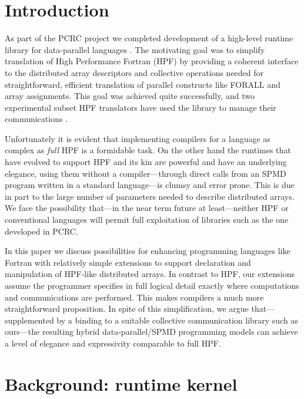 \section{Introduction}


As part of the PCRC \cite{Common_runtime} project we completed development of a
high-level runtime library for data-parallel languages \cite{NPAC_PCRC_kernel}.
The motivating goal was to simplify translation of High Performance
Fortran (HPF) \cite{HPFStandard} by providing a coherent interface to
the distributed array descriptors and collective operations needed for
straightforward, efficient translation of parallel constructs like
FORALL and array assignments.  This goal was achieved quite
successfully, and two experimental subset HPF translators have used the
library to manage their communications \cite{PCRC_based,shpf}.


Unfortunately it is evident that implementing compilers for 
a language as complex as {\em full} HPF is a formidable task.
On the other hand the runtimes that have evolved to support HPF
and its kin are powerful and have an underlying elegance, using them
without a compiler---through direct calls from an SPMD program written
in a standard language---is clumsy and error prone.  This is due in part
to the large number of parameters needed to describe distributed
arrays.  We face the possibility that---in the near term
future at least---neither HPF or conventional languages will permit
full exploitation of libraries such as the one developed in PCRC.

In this paper we discuss possibilities for enhancing
programming languages like Fortran with relatively
simple extensions to support
declaration and manipulation of HPF-like distributed arrays.  In
contrast to HPF, our extensions assume the programmer specifies in full
logical detail exactly where computations and communications are
performed.  This makes compilers a much more straightforward
proposition.  In spite of this simplification, we argue
that---supplemented by a binding to a suitable collective communication
library such as ours---the resulting hybrid data-parallel/SPMD
programming models can achieve a level of elegance and expressivity
comparable to full HPF.

\section{Background: runtime kernel\label{runtime}}

